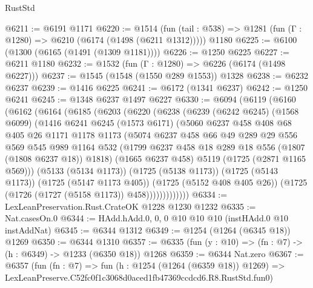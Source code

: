 \begin{lexlean}{RustStd}
\begin{coremodule}
@6211 := @6191 @1171
@6220 := @1514
    (fun (tail : @538) => @1281 (fun (Γ : @1280) => @6210 (@6174 (@1498 (@6211 @1312)))))
    @1180
@6225 := @6100 (@1300 (@6165 (@1491 (@1309 @1181))))
@6226 := @1250 @6225
@6227 := @6211 @1180
@6232 := @1532 (fun (Γ : @1280) => @6226 (@6174 (@1498 @6227)))
@6237 := @1545 (@1548 (@1550 @289 @1553)) @1328
@6238 := @6232 @6237
@6239 := @1416 @6225
@6241 := @6172 (@1341 @6237)
@6242 := @1250 @6241
@6245 := @1348 @6237 @1497 @6227
@6330 := @6094
    (@6119
      (@6160
        (@6162
          (@6164
            (@6185
              (@6203
                (@6220
                  (@6238
                    (@6239
                      (@6242 @6245)
                      (@1568 @6099)
                      (@1416
                        @6241
                        @6245
                        (@1573 @6171)
                        (@5060
                          @6237
                          @458
                          @408
                          @68
                          @405
                          @26
                          @1171
                          @1178
                          @1173
                          (@5074
                            @6237
                            @458
                            @66
                            @49
                            @289
                            @29
                            @556
                            @569
                            @545
                            @989
                            @1164
                            @532
                            (@1799 @6237 @458 @18 @289 @18 @556 (@1807 (@1808 @6237 @18)) @1818)
                            (@1665 @6237 @458)
                            @5119
                            (@1725 (@2871 @1165 @569)))
                          (@5133 (@5134 @1173))
                          (@1725 (@5138 @1173))
                          (@1725 (@5143 @1173))
                          (@1725 (@5147 @1173 @405))
                          (@1725 (@5152 @408 @405 @26))
                          (@1725 (@1726 (@1727 (@5158 @1173)) @458)))))))))))))
@6334 := LexLeanPreservation.Rust.CrateOK @1228 @1230 @1232
@6335 := Nat.casesOn.{0}
@6344 := HAdd.hAdd.{0, 0, 0} @10 @10 @10 (instHAdd.{0} @10 instAddNat)
@6345 := @6344 @1312
@6349 := @1254 (@1264 (@6345 @18)) @1269
@6350 := @6344 @1310
@6357 := @6335 (fun (y : @10) => (fn : @7) -> (h : @6349) -> @1233 (@6350 @18)) @1268
@6359 := @6344 Nat.zero
@6367 := @6357
    (fun (fn : @7) =>
    fun (h : @1254 (@1264 (@6359 @18)) @1269) =>
    LexLeanPreserve.C52fc0f1c3068d0aced1fb47369ccdcd6.R8.RustStd.fun0)

\end{coremodule}
\end{lexlean}
